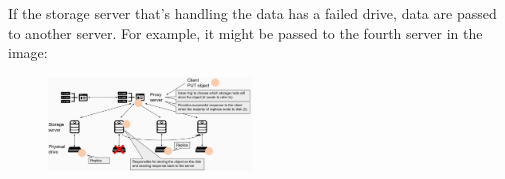 \begin{eg}
    \noindent
    If the storage server that's handling the data has a failed drive,
    data are passed to another server. For example, it might be passed to the
    fourth server in the image:

    \begin{figure}[h!]
        \centering
        \includegraphics[width=0.48\textwidth]{images/oss-put-6.png}
    \end{figure}
\end{eg}